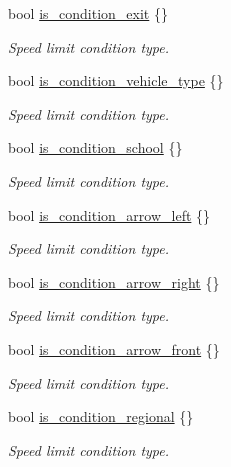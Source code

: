 \begin{DoxyCompactItemize}
bool \hyperlink{structmaf__perception__interface_1_1TrafficSign_a30df50d426a272a53f0660aac4f9ad2f}{is\+\_\+condition\+\_\+exit} \{\}
\begin{DoxyCompactList}\small\item\em Speed limit condition type. \end{DoxyCompactList}\item 
bool \hyperlink{structmaf__perception__interface_1_1TrafficSign_aacf1c1df8138f6b05c333efe419f1970}{is\+\_\+condition\+\_\+vehicle\+\_\+type} \{\}
\begin{DoxyCompactList}\small\item\em Speed limit condition type. \end{DoxyCompactList}\item 
bool \hyperlink{structmaf__perception__interface_1_1TrafficSign_a3a00b813632b925238253f18258781c1}{is\+\_\+condition\+\_\+school} \{\}
\begin{DoxyCompactList}\small\item\em Speed limit condition type. \end{DoxyCompactList}\item 
bool \hyperlink{structmaf__perception__interface_1_1TrafficSign_a641b1ff1938d8f7cc3d11b2f533466d2}{is\+\_\+condition\+\_\+arrow\+\_\+left} \{\}
\begin{DoxyCompactList}\small\item\em Speed limit condition type. \end{DoxyCompactList}\item 
bool \hyperlink{structmaf__perception__interface_1_1TrafficSign_ad5548e67606ba90ba6c71f2f1add3113}{is\+\_\+condition\+\_\+arrow\+\_\+right} \{\}
\begin{DoxyCompactList}\small\item\em Speed limit condition type. \end{DoxyCompactList}\item 
bool \hyperlink{structmaf__perception__interface_1_1TrafficSign_a8418fac33f8396a646a164d5630e3025}{is\+\_\+condition\+\_\+arrow\+\_\+front} \{\}
\begin{DoxyCompactList}\small\item\em Speed limit condition type. \end{DoxyCompactList}\item 
bool \hyperlink{structmaf__perception__interface_1_1TrafficSign_a04f6096c85f53d018fbe7321fa101343}{is\+\_\+condition\+\_\+regional} \{\}
\begin{DoxyCompactList}\small\item\em Speed limit condition type. \end{DoxyCompactList}\end{DoxyCompactItemize}


